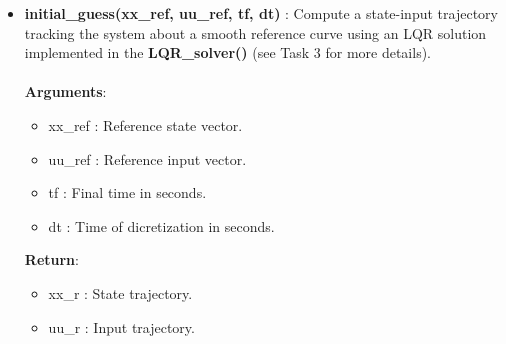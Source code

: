 \begin{itemize}
    \item \textbf{initial\_guess(xx\_ref, uu\_ref, tf, dt) }: Compute a state-input trajectory tracking the system about a smooth reference curve using an LQR solution implemented in the \textbf{LQR\_solver()} (see Task 3 for more details). \\\\
    \textbf{Arguments}:
    \begin{itemize}
        \item xx\_ref : Reference state vector.
        \item uu\_ref : Reference input vector.
        \item tf : Final time in seconds.
        \item dt : Time of dicretization in seconds.
    \end{itemize}
    \textbf{Return}:
    \begin{itemize}
        \item xx\_r : State trajectory.
        \item uu\_r : Input trajectory.
    \end{itemize}
\end{itemize}